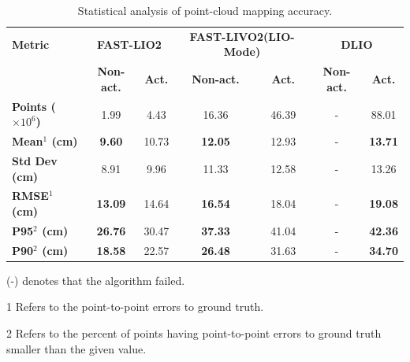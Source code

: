 \documentclass[english, bachelor, utf8]{base/thesis_telematics}
\begin{document}
\begin{table}
\centering
\begin{threeparttable}
\caption{Statistical analysis of point-cloud mapping accuracy.}
\label{tab:point_cloud_error}
\begin{tabular}{l|cc|cc|cc}
\toprule
\textbf{Metric} & \multicolumn{2}{c|}{\textbf{FAST-LIO2}} & \multicolumn{2}{c|}{\textbf{FAST-LIVO2(LIO-Mode)}} & \multicolumn{2}{c}{\textbf{DLIO}} \\
& \textbf{Non-act.} & \textbf{Act.} & \textbf{Non-act.} & \textbf{Act.} & \textbf{Non-act.} & \textbf{Act.} \\
\midrule
\textbf{Points ($\times 10^6$)} & 1.99 & 4.43 & 16.36 & 46.39 & - & 88.01 \\
\textbf{Mean$^1$ (cm)} & \bf{9.60} & 10.73 & \bf{12.05} & 12.93 & - & \bf{13.71} \\
\textbf{Std Dev (cm)} & 8.91 & 9.96 & 11.33 & 12.58 & - & 13.26 \\
\textbf{RMSE$^1$ (cm)} & \bf{13.09} & 14.64 & \bf{16.54} & 18.04 & - & \bf{19.08} \\
\textbf{P95$^2$ (cm)} & \bf{26.76} & 30.47 & \bf{37.33} & 41.04 & - & \bf{42.36} \\
\textbf{P90$^2$ (cm)} & \bf{18.58} & 22.57 & \bf{26.48} & 31.63 & - & \bf{34.70} \\
\bottomrule
\end{tabular}
\begin{tablenotes}
    \item (-) denotes that the algorithm failed.
    \item[1] Refers to the point-to-point errors to ground truth.
    \item[2] Refers to the percent of points having point-to-point errors to ground truth smaller than the given value. 
\end{tablenotes}
\end{threeparttable}
\end{table}
\clearpage
\end{document}
